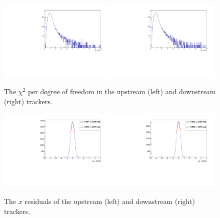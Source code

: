   \begin{figure}[p]
   \centering
    \includegraphics[width=0.49\textwidth, angle=0]{08-Performance/chi_squared_ndf_up.pdf}
    \includegraphics[width=0.49\textwidth, angle=0]{08-Performance/chi_squared_ndf_down.pdf}
   \caption{\label{fig:track_chisq} The $\chi^2$ per degree of freedom in the upstream (left) and downstream (right) trackers.}
  \end{figure}
  
  \begin{figure}[p]
    \begin{center}
      \includegraphics[width=0.49\textwidth, angle=0]{08-Performance/upstream_x_residual.pdf}
      \includegraphics[width=0.49\textwidth, angle=0]{08-Performance/downstream_x_residual.pdf}
      \caption{\label{fig:XResidKalman} The $x$ residuals of the upstream (left) and downstream (right) trackers.}
    \end{center}
  \end{figure}
  
